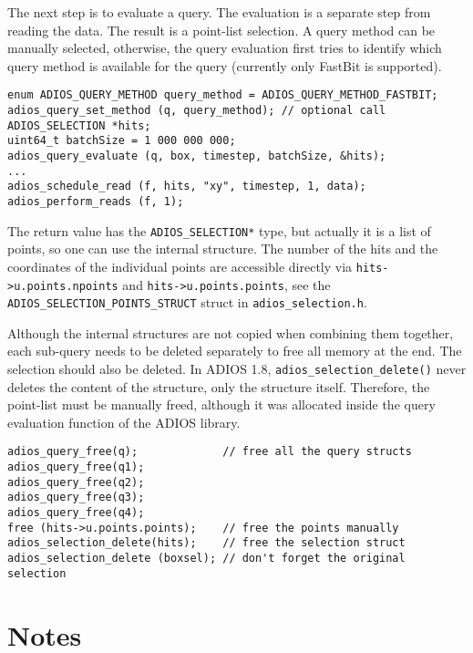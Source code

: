 \noindent The next step is to evaluate a query. The evaluation is a separate step from reading the data. The result is a point-list selection.  A query method can be manually selected, otherwise, the query evaluation first tries to identify which query method is available for the query (currently only FastBit is supported). 

\begin{lstlisting}[alsolanguage=C]
enum ADIOS_QUERY_METHOD query_method = ADIOS_QUERY_METHOD_FASTBIT;
adios_query_set_method (q, query_method); // optional call
ADIOS_SELECTION *hits;
uint64_t batchSize = 1 000 000 000;
adios_query_evaluate (q, box, timestep, batchSize, &hits);
...
adios_schedule_read (f, hits, "xy", timestep, 1, data);
adios_perform_reads (f, 1);
\end{lstlisting}

The return value has the \verb+ADIOS_SELECTION*+ type, but actually it is a list of points, so one can use the internal structure. The number of the hits and the coordinates of the individual points are accessible directly via 
\linebreak \verb+hits->u.points.npoints+ and \verb+hits->u.points.points+, see the \verb+ADIOS_SELECTION_POINTS_STRUCT+ struct in \verb+adios_selection.h+.

Although the internal structures are not copied when combining them together, each sub-query needs to be deleted separately to free all memory at the end. The selection should also be deleted. In ADIOS 1.8, \linebreak \verb+adios_selection_delete()+ never deletes the content of the structure, only the structure itself. Therefore, the point-list must be manually freed, although it was allocated inside the query evaluation function of the ADIOS library. 

\begin{lstlisting}[alsolanguage=C]
adios_query_free(q);             // free all the query structs
adios_query_free(q1);
adios_query_free(q2);
adios_query_free(q3);
adios_query_free(q4);
free (hits->u.points.points);    // free the points manually
adios_selection_delete(hits);    // free the selection struct
adios_selection_delete (boxsel); // don't forget the original selection
\end{lstlisting}

%
%
\section{Notes}

